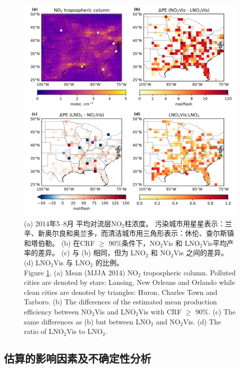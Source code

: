 \begin{figure}[!htbp]
\centering
\includegraphics[width=13cm]{./figures/us_delta.png}
\caption{(a) 2014年5--8月  平均对流层NO$_\textrm{2}$柱浓度。
污染城市用星星表示：兰辛、新奥尔良和奥兰多，而清洁城市用三角形表示：休伦、查尔斯镇和塔伯勒。
(b) 在CRF $\geq$ 90\%条件下，NO$_\textrm{2}$Vis 和 LNO$_\textrm{2}$Vis平均产率的差异。
(c) 与 (b) 相同，但为 LNO$_\textrm{2}$ 和 NO$_\textrm{2}$Vis 之间的差异。
(d) LNO$_\textrm{2}$Vis 与 LNO$_\textrm{2}$ 的比例。\\
Figure \ref{fig:us_delta}.
(a) Mean (MJJA 2014) NO$_\textrm{2}$ tropospheric column.
Polluted cities are denoted by stars: Lansing, New Orleans and Orlando while clean cities are denoted by triangles: Huron, Charles Town and Tarboro.
(b) The differences of the estimated mean production efficiency between NO$_\textrm{2}$Vis and LNO$_\textrm{2}$Vis with CRF $\geq$ 90\%.
(c) The same differences as (b) but between LNO$_\textrm{2}$ and NO$_\textrm{2}$Vis.
(d) The ratio of LNO$_\textrm{2}$Vis to LNO$_\textrm{2}$.
}
\label{fig:us_delta}
\end{figure}

\subsection{估算的影响因素及不确定性分析} \label{sec:uncertainty}

